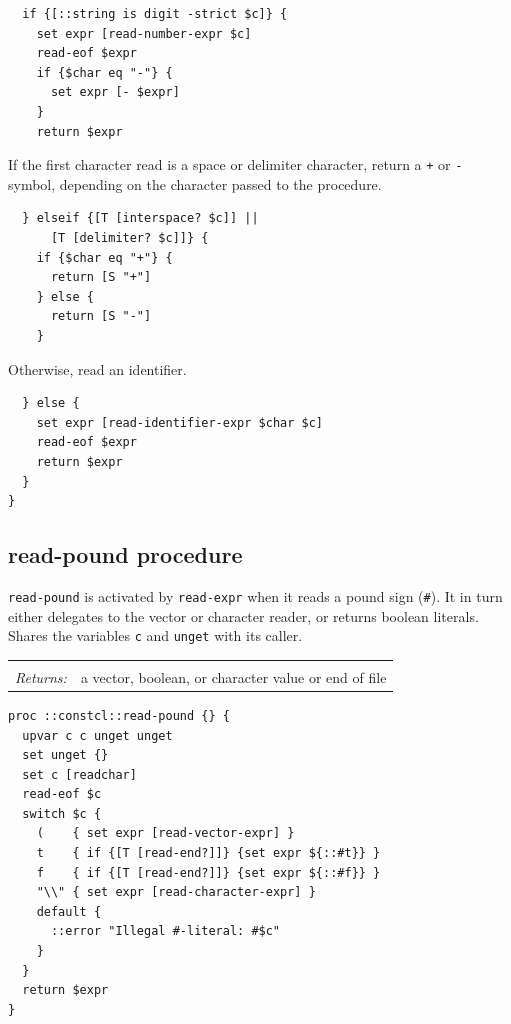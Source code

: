 \documentclass[twoside]{report}
\begin{document}
\begin{lstlisting}
  if {[::string is digit -strict $c]} {
    set expr [read-number-expr $c]
    read-eof $expr
    if {$char eq "-"} {
      set expr [- $expr]
    }
    return $expr
\end{lstlisting}

If the first character read is a space or delimiter character, return a \texttt{+} or \texttt{-} symbol, depending on the character passed to the procedure.

\begin{lstlisting}
  } elseif {[T [interspace? $c]] ||
      [T [delimiter? $c]]} {
    if {$char eq "+"} {
      return [S "+"]
    } else {
      return [S "-"]
    }
\end{lstlisting}

Otherwise, read an identifier.

\begin{lstlisting}
  } else {
    set expr [read-identifier-expr $char $c]
    read-eof $expr
    return $expr
  }
}
\end{lstlisting}

\subsection{read-pound procedure}
\label{readpound-procedure}

\texttt{read-pound} is activated by \texttt{read-expr} when it reads a pound sign (\texttt{\#}). It in turn either delegates to the vector or character reader, or returns boolean literals. Shares the variables \texttt{c} and \texttt{unget} with its caller.

\noindent\begin{tabular}{ |p{1.9cm} p{8cm}| }
\hline
\rowcolor[HTML]{CCCCCC} \multicolumn{2}{|l|}{\bf read-pound (internal)} \\
\textit{Returns:} & a vector, boolean, or character value or end of file \\
\hline
\end{tabular}

\begin{lstlisting}
proc ::constcl::read-pound {} {
  upvar c c unget unget
  set unget {}
  set c [readchar]
  read-eof $c
  switch $c {
    (    { set expr [read-vector-expr] }
    t    { if {[T [read-end?]]} {set expr ${::#t}} }
    f    { if {[T [read-end?]]} {set expr ${::#f}} }
    "\\" { set expr [read-character-expr] }
    default {
      ::error "Illegal #-literal: #$c"
    }
  }
  return $expr
}
\end{lstlisting}
\end{document}
